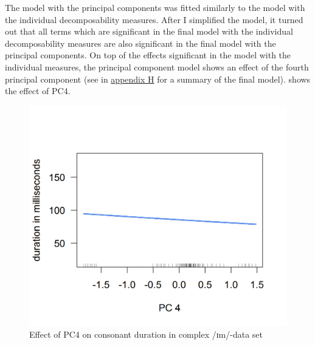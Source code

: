 The model with the principal components was fitted similarly to the model with the individual decomposability measures. After I simplified the model, it turned out that all terms which are significant in the final model with the individual decomposability measures are also significant in the final model with the principal components. On top of the effects significant in the model with the individual measures, the principal component model shows an effect of the fourth principal component (see  in \hyperref[Appendix H: Model Summaries Experiment]{appendix H} for a summary of the final model).  shows the effect of \textsc{PC4}.

\begin{figure} [h!]
	\centering

	\includegraphics [scale=0.5] {images/Experiment/imModelPC}
	\caption{Effect of PC4 on consonant duration in complex /ɪm/-data set}
	\label{fig:PC 4 imComplex experiment}

\end{figure}


